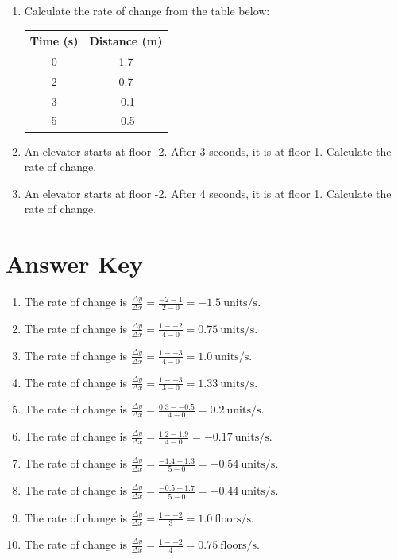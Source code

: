 \documentclass[12pt]{article}
\begin{document}
\begin{enumerate}
\vspace{2cm}
\item Calculate the rate of change from the table below:

\begin{tabular}{|c|c|}
\hline
Time (s) & Distance (m) \\
\hline
0 & 1.7 \\
2 & 0.7 \\
3 & -0.1 \\
5 & -0.5 \\
\hline
\end{tabular}

\vspace{2cm}
\newpage\item An elevator starts at floor -2. After 3 seconds, it is at floor 1. Calculate the rate of change.

\vspace{7cm}
\newpage\item An elevator starts at floor -2. After 4 seconds, it is at floor 1. Calculate the rate of change.

\vspace{7cm}
\end{enumerate}
\newpage
\section*{Answer Key}
\begin{enumerate}
\item The rate of change is $\frac{\Delta y}{\Delta x} = \frac{-2-1}{2-0} = -1.5~\text{units/s}$.

\item The rate of change is $\frac{\Delta y}{\Delta x} = \frac{1--2}{4-0} = 0.75~\text{units/s}$.

\item The rate of change is $\frac{\Delta y}{\Delta x} = \frac{1--3}{4-0} = 1.0~\text{units/s}$.

\item The rate of change is $\frac{\Delta y}{\Delta x} = \frac{1--3}{3-0} = 1.33~\text{units/s}$.

\item The rate of change is $\frac{\Delta y}{\Delta x} = \frac{0.3--0.5}{4-0} = 0.2~\text{units/s}$.

\item The rate of change is $\frac{\Delta y}{\Delta x} = \frac{1.2-1.9}{4-0} = -0.17~\text{units/s}$.

\item The rate of change is $\frac{\Delta y}{\Delta x} = \frac{-1.4-1.3}{5-0} = -0.54~\text{units/s}$.

\item The rate of change is $\frac{\Delta y}{\Delta x} = \frac{-0.5-1.7}{5-0} = -0.44~\text{units/s}$.

\item The rate of change is $\frac{\Delta y}{\Delta x} = \frac{1--2}{3} = 1.0~\text{floors/s}$.

\item The rate of change is $\frac{\Delta y}{\Delta x} = \frac{1--2}{4} = 0.75~\text{floors/s}$.

\end{enumerate}
\end{document}
